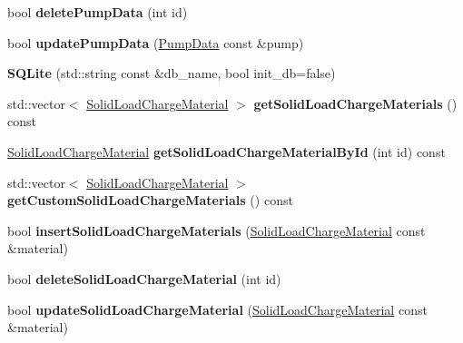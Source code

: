 \begin{DoxyCompactItemize}
bool {\bfseries delete\+Pump\+Data} (int id)
\item 
\mbox{\label{class_s_q_lite_a5b7471c6eff2fd62ab2d465dd85e0768}} 
bool {\bfseries update\+Pump\+Data} (\hyperlink{class_pump_data}{Pump\+Data} const \&pump)
\item 
\mbox{\label{class_s_q_lite_a758f334ed7e72820f4f0e83d2b707625}} 
{\bfseries S\+Q\+Lite} (std\+::string const \&db\+\_\+name, bool init\+\_\+db=false)
\item 
\mbox{\label{class_s_q_lite_af6195f55e9658c24a8f14b884e490acb}} 
std\+::vector$<$ \hyperlink{class_solid_load_charge_material}{Solid\+Load\+Charge\+Material} $>$ {\bfseries get\+Solid\+Load\+Charge\+Materials} () const
\item 
\mbox{\label{class_s_q_lite_ab2a00b913321a96a4d7b700627195616}} 
\hyperlink{class_solid_load_charge_material}{Solid\+Load\+Charge\+Material} {\bfseries get\+Solid\+Load\+Charge\+Material\+By\+Id} (int id) const
\item 
\mbox{\label{class_s_q_lite_a868c571d80d43a991762ec20c168ebb2}} 
std\+::vector$<$ \hyperlink{class_solid_load_charge_material}{Solid\+Load\+Charge\+Material} $>$ {\bfseries get\+Custom\+Solid\+Load\+Charge\+Materials} () const
\item 
\mbox{\label{class_s_q_lite_a5c40ac3b9a6abb85c9cfbe50802672c5}} 
bool {\bfseries insert\+Solid\+Load\+Charge\+Materials} (\hyperlink{class_solid_load_charge_material}{Solid\+Load\+Charge\+Material} const \&material)
\item 
\mbox{\label{class_s_q_lite_a0a240c89a1e0c96ef61c3beae68b1467}} 
bool {\bfseries delete\+Solid\+Load\+Charge\+Material} (int id)
\item 
\mbox{\label{class_s_q_lite_ac2c7142caa0154783f7ed73afa4bd6db}} 
bool {\bfseries update\+Solid\+Load\+Charge\+Material} (\hyperlink{class_solid_load_charge_material}{Solid\+Load\+Charge\+Material} const \&material)
\item 
\mbox{\label{class_s_q_lite_accd7e97b19298b75eabc3a2b4bbc9b1c}} 

\end{DoxyCompactItemize}
